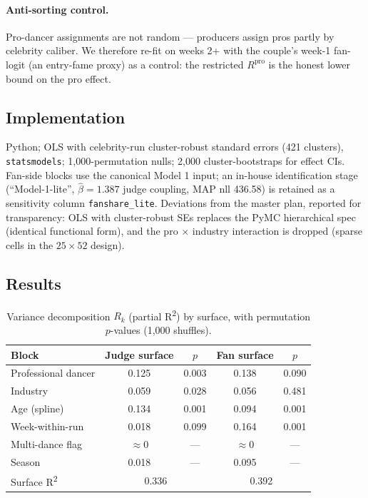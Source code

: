\documentclass[11pt]{article}
\begin{document}
\paragraph{Anti-sorting control.} Pro-dancer assignments are not random --- producers
assign pros partly by celebrity caliber. We therefore re-fit on weeks 2+ with the
couple's week-1 fan-logit (an entry-fame proxy) as a control: the restricted
$R^{\text{pro}}$ is the honest lower bound on the pro effect.

\subsection{Implementation}

Python; OLS with celebrity-run cluster-robust standard errors (421 clusters),
\texttt{statsmodels}; 1{,}000-permutation nulls; 2{,}000 cluster-bootstraps for effect
CIs. Fan-side blocks use the canonical Model 1 input; an in-house identification
stage (``Model-1-lite'', $\hat\beta = 1.387$ judge coupling, MAP nll 436.58) is
retained as a sensitivity column \texttt{fanshare\_lite}. Deviations from the master
plan, reported for transparency: OLS with cluster-robust SEs replaces the PyMC
hierarchical spec (identical functional form), and the pro $\times$ industry
interaction is dropped (sparse cells in the $25 \times 52$ design).

\subsection{Results}

\begin{table}[H]
\centering
\caption{Variance decomposition $R_k$ (partial R\textsuperscript{2}) by surface,
with permutation $p$-values (1{,}000 shuffles).}
\label{tab:m2decomp}
\small
\begin{tabular}{lcccc}
\toprule
Block & Judge surface & $p$ & Fan surface & $p$ \\
\midrule
Professional dancer & 0.125 & 0.003 & 0.138 & 0.090 \\
Industry & 0.059 & 0.028 & 0.056 & 0.481 \\
Age (spline) & 0.134 & 0.001 & 0.094 & 0.001 \\
Week-within-run & 0.018 & 0.099 & 0.164 & 0.001 \\
Multi-dance flag & $\approx 0$ & --- & $\approx 0$ & --- \\
Season & 0.018 & --- & 0.095 & --- \\
\midrule
Surface R\textsuperscript{2} & \multicolumn{2}{c}{0.336} & \multicolumn{2}{c}{0.392} \\
\bottomrule
\end{tabular}
\end{table}
\end{document}
